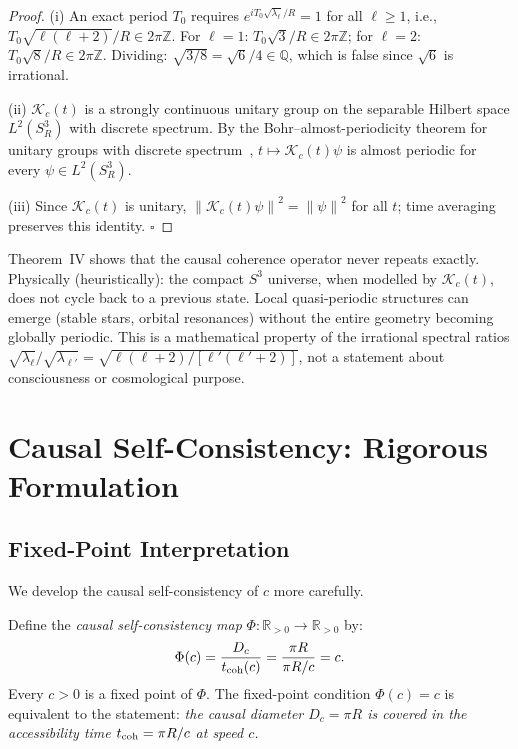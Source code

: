 \documentclass[12pt,a4paper]{article}
\theoremstyle{plain}
\theoremstyle{definition}
\theoremstyle{remark}
\newcommand{\norm}[1]{\left\|#1\right\|}
\begin{document}
\begin{proof}
(i) An exact period $T_0$ requires $e^{iT_0\sqrt{\lambda_\ell}/R} = 1$ for all $\ell \ge 1$,
i.e., $T_0\sqrt{\ell(\ell+2)}/R \in 2\pi\mathbb{Z}$.
For $\ell=1$: $T_0\sqrt{3}/R \in 2\pi\mathbb{Z}$;
for $\ell=2$: $T_0\sqrt{8}/R \in 2\pi\mathbb{Z}$.
Dividing: $\sqrt{3/8} = \sqrt{6}/4 \in \mathbb{Q}$, which is false since $\sqrt{6}$
is irrational.

(ii) $\mathcal{K}_c(t)$ is a strongly continuous unitary group on the separable
Hilbert space $L^2(S^3_R)$ with discrete spectrum.
By the Bohr--almost-periodicity theorem for unitary groups with discrete
spectrum~\cite{RS72}, $t \mapsto \mathcal{K}_c(t)\psi$ is almost periodic for
every $\psi \in L^2(S^3_R)$.

(iii) Since $\mathcal{K}_c(t)$ is unitary,
$\norm{\mathcal{K}_c(t)\psi}^2 = \norm{\psi}^2$ for all $t$;
time averaging preserves this identity.
\hfill$\square$
\end{proof}

\begin{tcolorbox}[philobox={Philosophical Note 7.1 — Non-Resonance and Dynamic Openness}]
Theorem~IV shows that the causal coherence operator never repeats exactly.
Physically (heuristically): the compact $S^3$ universe, when modelled by
$\mathcal{K}_c(t)$, does not cycle back to a previous state.
Local quasi-periodic structures can emerge (stable stars, orbital resonances)
without the entire geometry becoming globally periodic.
This is a mathematical property of the irrational spectral ratios
$\sqrt{\lambda_\ell}/\sqrt{\lambda_{\ell'}} = \sqrt{\ell(\ell+2)/[\ell'(\ell'+2)]}$,
not a statement about consciousness or cosmological purpose.
\end{tcolorbox}

\section{Causal Self-Consistency: Rigorous Formulation}
\label{sec:selfconsistency}

\subsection{Fixed-Point Interpretation}

We develop the causal self-consistency of $c$ more carefully.

\begin{tcolorbox}[defbox={Definition 8.1 — Causal Self-Consistency Map}]
Define the \emph{causal self-consistency map} $\Phi : \mathbb{R}_{>0} \to \mathbb{R}_{>0}$ by:
\begin{equation}
  \Phi(c) = \frac{D_c}{t_{\rm coh}(c)} = \frac{\pi R}{\pi R/c} = c.
  \label{eq:Phi}
\end{equation}
Every $c > 0$ is a fixed point of $\Phi$.
The fixed-point condition $\Phi(c) = c$ is equivalent to the statement:
\emph{the causal diameter $D_c = \pi R$ is covered in the accessibility
time $t_{\rm coh} = \pi R/c$ at speed $c$.}
\end{tcolorbox}
\end{document}
